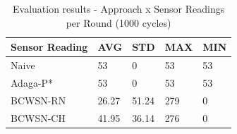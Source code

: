 \documentclass[conference]{IEEEtran}
\begin{document}
\begin{table}[h!]
\caption{Evaluation results - Approach x Sensor Readings per Round (1000 cycles)}
\label{tab:sens-read}
\begin{center}
\begin{tabular}{|l||l|l|l|l|}
\hline
Sensor Reading &AVG &STD &MAX &MIN \\
\hline\hline
Naive &53 &0 &53 &53 \\
\hline
Adaga-P* &53 &0 &53 &53 \\
\hline
BCWSN-RN &26.27 &51.24 &279 &0 \\
\hline
BCWSN-CH &41.95 &36.14 &276 &0 \\
\hline
\end{tabular}
\end{center}
\end{table}
\end{document}
